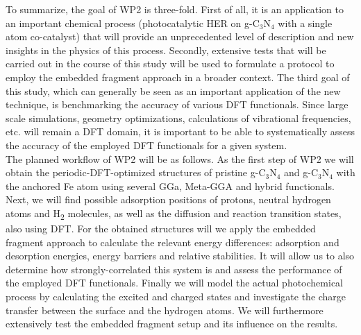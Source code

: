 \documentclass[a4paper,11pt,headings=normal]{scrartcl}
\begin{document}
To summarize, the goal of WP2 is three-fold. First of all, it is an application to 
an important chemical process (photocatalytic HER on g-C$_3$N$_4$ with a single 
atom co-catalyst) that will provide an unprecedented level of description and new 
insights in the physics of this process. Secondly, extensive tests that will be 
carried out in the course of this study will be used to formulate a protocol to 
employ the embedded fragment approach in a broader context. The third goal of this 
study, which can generally be seen as an important application of the new 
technique, is benchmarking the accuracy of various DFT functionals. Since large 
scale simulations, geometry optimizations, calculations of vibrational 
frequencies, etc. will remain a DFT domain, it is important to be able to 
systematically assess the accuracy of the employed DFT functionals for a given 
system.\\
The planned workflow of WP2 will be as follows. As the first step of WP2 we will 
obtain the periodic-DFT-optimized structures of pristine g-C$_3$N$_4$ and 
g-C$_3$N$_4$ with the anchored Fe atom using several GGa, Meta-GGA and hybrid 
functionals. Next, we will find possible adsorption positions of protons, neutral 
hydrogen atoms and H\textsubscript{2} molecules, as well as the diffusion and 
reaction transition states, also using DFT. For the obtained structures will we 
apply the embedded fragment approach to calculate the relevant energy differences: 
adsorption and desorption energies, energy barriers and relative stabilities. It 
will allow us to also determine how strongly-correlated this system is and assess 
the performance of the employed DFT functionals. Finally we will model the actual 
photochemical process by calculating the excited and charged states and 
investigate the charge transfer between the surface and the hydrogen atoms. We 
will furthermore extensively test the embedded fragment setup and its influence 
on the results.\\
\newpage
\end{document}

